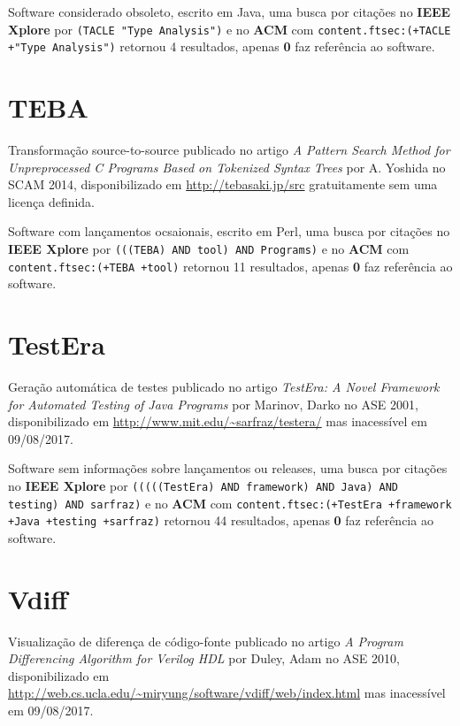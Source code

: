 Software considerado obsoleto,
escrito em Java,
uma busca por citações no {\bf IEEE Xplore} por
\texttt{(TACLE "Type Analysis")}
e no {\bf ACM} com
\texttt{content.ftsec:(+TACLE +"Type Analysis")}
retornou
4 resultados, apenas
{\bf 0} faz referência ao software.



\section{TEBA}

Transformação source-to-source
publicado no artigo {\it A Pattern Search Method for Unpreprocessed C Programs Based on Tokenized Syntax Trees}
por A. Yoshida
no SCAM 2014,
disponibilizado em \url{http://tebasaki.jp/src}
gratuitamente
sem uma licença definida.

Software com lançamentos ocsaionais,
escrito em Perl,
uma busca por citações no {\bf IEEE Xplore} por
\texttt{(((TEBA) AND tool) AND Programs)}
e no {\bf ACM} com
\texttt{content.ftsec:(+TEBA +tool)}
retornou
11 resultados, apenas
{\bf 0} faz referência ao software.



\section{TestEra}

Geração automática de testes
publicado no artigo {\it TestEra: A Novel Framework for Automated Testing of Java Programs}
por Marinov, Darko
no ASE 2001,
disponibilizado em \url{http://www.mit.edu/~sarfraz/testera/}
mas inacessível em 09/08/2017.

Software sem informações sobre lançamentos ou releases,
uma busca por citações no {\bf IEEE Xplore} por
\texttt{(((((TestEra) AND framework) AND Java) AND testing) AND sarfraz)}
e no {\bf ACM} com
\texttt{content.ftsec:(+TestEra +framework +Java +testing +sarfraz)}
retornou
44 resultados, apenas
{\bf 0} faz referência ao software.



\section{Vdiff}

Visualização de diferença de código-fonte
publicado no artigo {\it A Program Differencing Algorithm for Verilog HDL}
por Duley, Adam
no ASE 2010,
disponibilizado em \url{http://web.cs.ucla.edu/~miryung/software/vdiff/web/index.html}
mas inacessível em 09/08/2017.

